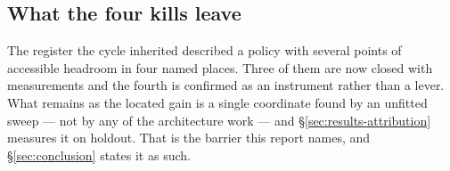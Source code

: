 \subsection{What the four kills leave}
\label{sec:rejected-leaves}

The register the cycle inherited described a policy with several points of accessible headroom in
four named places. Three of them are now closed with measurements and the fourth is confirmed as an
instrument rather than a lever. What remains as the located gain is a single coordinate found by an
unfitted sweep --- not by any of the architecture work --- and \S\ref{sec:results-attribution}
measures it on holdout. That is the barrier this report names, and \S\ref{sec:conclusion} states it
as such.
